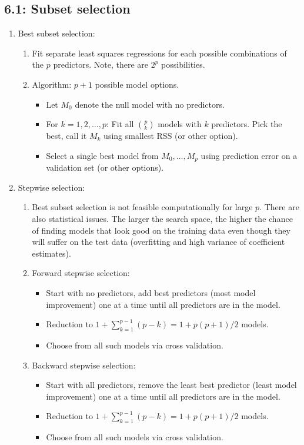 \documentclass{article}
\begin{document}
\subsection*{6.1: Subset selection}

\begin{enumerate}
\item Best subset selection:
\begin{enumerate}
\item Fit separate least squares regressions for each possible combinations of the $p$ predictors. Note, there are $2^p$ possibilities.
\item Algorithm: $p+1$ possible model options.
\begin{itemize}
\item Let $M_0$ denote the null model with no predictors.
\item For $k=1,2,\dots,p$: Fit all ${p}\choose{k}$ models with $k$ predictors. Pick the best, call it $M_k$ using smallest RSS (or other option).
\item Select a single best model from $M_0, \dots, M_p$ using prediction error on a validation set (or other options).
\end{itemize}
\end{enumerate}

\item Stepwise selection:
\begin{enumerate}
\item Best subset selection is not feasible computationally for large $p$. There are also statistical issues. The larger the search space, the higher the chance of finding models that look good on the training data even though they will suffer on the test data (overfitting and high variance of coefficient estimates).

\item Forward stepwise selection:
\begin{itemize}
\item Start with no predictors, add best predictors (most model improvement) one at a time until all predictors are in the model.
\item Reduction to $1 + \sum_{k=1}^{p-1}(p-k) = 1 + p(p+1)/2$ models.
\item Choose from all such models via cross validation.
\end{itemize}

\item Backward stepwise selection:
\begin{itemize}
\item Start with all predictors, remove the least best predictor (least model improvement) one at a time until all predictors are in the model.
\item Reduction to $1 + \sum_{k=1}^{p-1}(p-k) = 1 + p(p+1)/2$ models.
\item Choose from all such models via cross validation.
\end{itemize}


\end{enumerate}
\end{enumerate}
\end{document}
